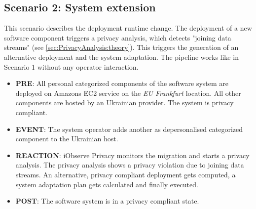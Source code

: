 \subsection{Scenario 2: System extension}
\label{eval:scenario:2}

This scenario describes the deployment runtime change. The deployment of a new software component triggers a privacy analysis, which detects "joining data streams" (see \autoref{sec:PrivacyAnalysis:theory}). This triggers the generation of an alternative deployment and the system adaptation. The pipeline works like in Scenario 1 without any operator interaction.
\begin{itemize}
	\setlength\itemsep{0em}
	\item \textbf{PRE}: All personal categorized components of the software system are deployed on Amazons EC2 service on the \textit{EU Frankfurt} location. All other components are hosted by an Ukrainian provider. The system is privacy compliant.
	\item \textbf{EVENT}: The system operator adds another as depersonalised categorized component to the Ukrainian host.
	\item \textbf{REACTION}: iObserve Privacy monitors the migration and starts a privacy analysis. The privacy analysis shows a privacy violation due to joining data streams. An alternative, privacy compliant deployment gets computed, a system adaptation plan gets calculated and finally executed.
	\item \textbf{POST}: The software system is in a privacy compliant state.
\end{itemize}

